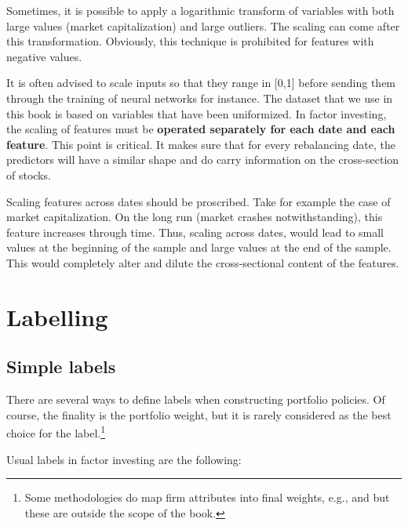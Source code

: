 \documentclass[]{krantz}
\let\rmarkdownfootnote\footnote%
\def\footnote{\protect\rmarkdownfootnote}
\theoremstyle{definition}
\theoremstyle{definition}
\theoremstyle{definition}
\theoremstyle{remark}
\begin{document}
Sometimes, it is possible to apply a logarithmic transform of variables
with both large values (market capitalization) and large outliers. The
scaling can come after this transformation. Obviously, this technique is
prohibited for features with negative values.

It is often advised to scale inputs so that they range in {[}0,1{]}
before sending them through the training of neural networks for
instance. The dataset that we use in this book is based on variables
that have been uniformized. In factor investing, the scaling of features
must be \textbf{operated separately for each date and each feature}.
This point is critical. It makes sure that for every rebalancing date,
the predictors will have a similar shape and do carry information on the
cross-section of stocks.

Scaling features across dates should be proscribed. Take for example the
case of market capitalization. On the long run (market crashes
notwithstanding), this feature increases through time. Thus, scaling
across dates, would lead to small values at the beginning of the sample
and large values at the end of the sample. This would completely alter
and dilute the cross-sectional content of the features.

\hypertarget{labelling}{%
\section{Labelling}\label{labelling}}

\hypertarget{simple-labels}{%
\subsection{Simple labels}\label{simple-labels}}

There are several ways to define labels when constructing portfolio
policies. Of course, the finality is the portfolio weight, but it is
rarely considered as the best choice for the label.\footnote{Some
  methodologies do map firm attributes into final weights, e.g.,
  \citet{brandt2009parametric} and \citet{ammann2016characteristics} but
  these are outside the scope of the book.}

Usual labels in factor investing are the following:
\end{document}
